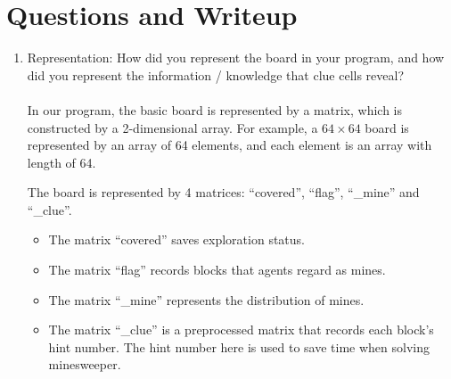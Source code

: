 \documentclass[letter]{article}
\begin{document}
\section{Questions and Writeup}
\label{sec:Questions and Writeup}
\begin{enumerate}
	\item {Representation: How did you represent the board in your program, and how did you represent the information / knowledge that clue cells reveal?} \\
	\\
	In our program, the basic board is represented by a matrix, which is constructed by a 2-dimensional array. For example, a $ 64 \times 64 $ board is represented by an array of 64 elements, and each element is an array with length of 64. 
	
	The board is represented by 4 matrices:  ``covered'', ``flag'',  ``\_mine'' and ``\_clue''. 
	\begin{itemize}
		\item {The matrix ``covered'' saves exploration status. }
		\item {The matrix ``flag'' records blocks that agents regard as mines.} 
		\item {The matrix ``\_mine'' represents the distribution of mines.} 
		\item {The matrix ``\_clue'' is a preprocessed matrix that records each block’s hint number. The hint number here is used to save time when solving minesweeper.} 
	\end{itemize}   
	

\end{enumerate}
\end{document}
